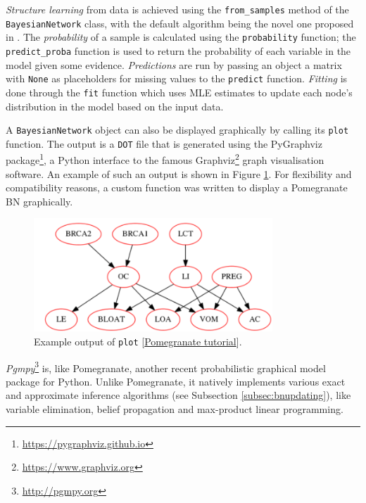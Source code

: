 \textit{Structure learning} from data is achieved using the \texttt{from\_samples} method of the \\ \texttt{BayesianNetwork} class, with the default algorithm being the novel one proposed in \citep{schreiber_noble_2017}.
The \textit{probability} of a sample is calculated using the \texttt{probability} function; the \texttt{predict\_proba} function is used to return the probability of each variable in the model given some evidence.
\textit{Predictions} are run by passing an object a matrix with \texttt{None} as placeholders for missing values to the \texttt{predict} function.
\textit{Fitting} is done through the \texttt{fit} function which uses MLE estimates to update each node's distribution in the model based on the input data.

A \texttt{BayesianNetwork} object can also be displayed graphically by calling its \texttt{plot} function.
The output is a \texttt{DOT} file that is generated using the PyGraphviz package\footnote{\url{https://pygraphviz.github.io}}, a Python interface to the famous Graphviz\footnote{\url{https://www.graphviz.org}} graph visualisation software.
An example of such an output is shown in Figure \ref{fig:Pomegranate_graph_example}.
For flexibility and compatibility reasons, a custom function was written to display a Pomegranate BN graphically.

\begin{figure}[htbp]
\centerline{\includegraphics[width=0.8\textwidth]{methodology/images/Pomegranate_example}}
\caption{Example output of \texttt{plot} [\href{https://github.com/jmschrei/Pomegranate/blob/master/tutorials/B_Model_Tutorial_4b_Bayesian_Network_Structure_Learning.ipynb}{Pomegranate tutorial}].}
\label{fig:Pomegranate_graph_example}
\end{figure}

\textit{Pgmpy}\footnote{\url{http://pgmpy.org}} is, like Pomegranate, another recent probabilistic graphical model package for Python.
Unlike Pomegranate, it natively implements various exact and approximate inference algorithms (see Subsection \ref{subsec:bnupdating}), like variable elimination, belief propagation and max-product linear programming.

